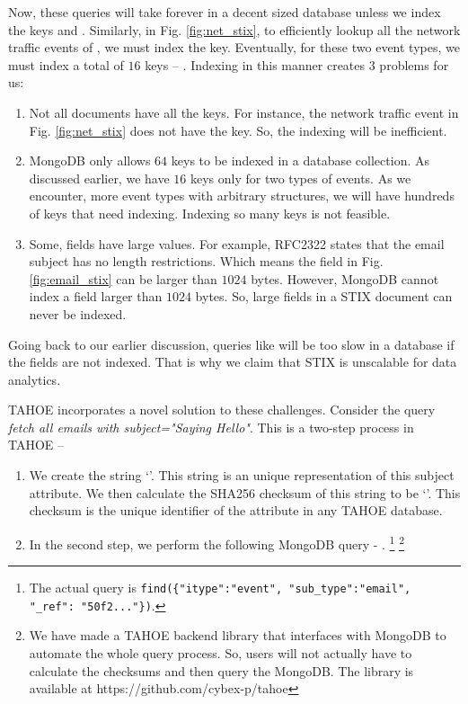 Now, these queries will take forever in a decent sized database unless we index the keys  and . Similarly, in Fig. \ref{fig:net_stix}, to efficiently lookup all the network traffic events of , we must index the  key. Eventually, for these two event types, we must index a total of $16$ keys -- . Indexing in this manner creates $3$ problems for us:

\begin{enumerate}
    \item Not all documents have all the keys. For instance, the network traffic event in Fig. \ref{fig:net_stix} does not have the  key. So, the indexing will be inefficient.
    \item MongoDB only allows $64$ keys to be indexed in a database collection. As discussed earlier, we have $16$ keys only for two types of events. As we encounter, more event types with arbitrary structures, we will have hundreds of keys that need indexing. Indexing so many keys is not feasible.
    \item Some, fields have large values. For example, RFC2322 states that the email subject has no length restrictions. Which means the  field in Fig. \ref{fig:email_stix} can be larger than $1024$ bytes. However, MongoDB cannot index a field larger than $1024$ bytes. So, large fields in a STIX document can never be indexed.
\end{enumerate}

Going back to our earlier discussion, queries like  will be too slow in a database if the fields are not indexed. That is why we claim that STIX is unscalable for data analytics.

TAHOE incorporates a novel solution to these challenges. Consider the query \textit{fetch all emails with subject="Saying Hello"}. This is a two-step process in TAHOE --

\begin{enumerate}
    \item We create the string `'. This string is an unique representation of this subject attribute. We then calculate the SHA256 checksum of this string to be `'. This checksum is the unique identifier of the attribute  in any TAHOE database.
    \item In the second step, we perform the following MongoDB query - . \footnote{The actual query is \texttt{find(\{"itype":"event", "sub\_type":"email", "\_ref": "50f2..."\})}.} \footnote{We have made a TAHOE backend library that interfaces with MongoDB to automate the whole query process. So, users will not actually have to calculate the checksums and then query the MongoDB. The library is available at https://github.com/cybex-p/tahoe}
\end{enumerate}


